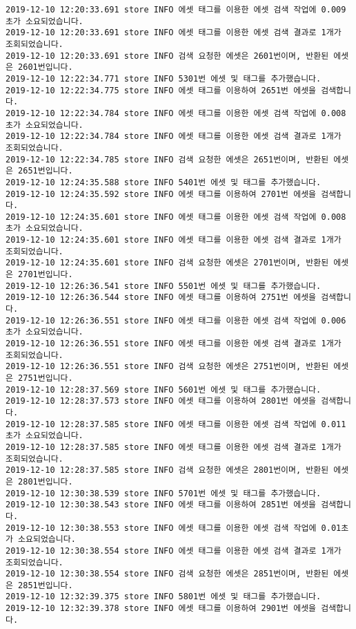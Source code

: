 \begin{Verbatim}[fontsize=\tiny, breaklines=true, breakanywhere=true]
2019-12-10 12:20:33.691 store INFO 에셋 태그를 이용한 에셋 검색 작업에 0.009초가 소요되었습니다.
2019-12-10 12:20:33.691 store INFO 에셋 태그를 이용한 에셋 검색 결과로 1개가 조회되었습니다.
2019-12-10 12:20:33.691 store INFO 검색 요청한 에셋은 2601번이며, 반환된 에셋은 2601번입니다.
2019-12-10 12:22:34.771 store INFO 5301번 에셋 및 태그를 추가했습니다.
2019-12-10 12:22:34.775 store INFO 에셋 태그를 이용하여 2651번 에셋을 검색합니다.
2019-12-10 12:22:34.784 store INFO 에셋 태그를 이용한 에셋 검색 작업에 0.008초가 소요되었습니다.
2019-12-10 12:22:34.784 store INFO 에셋 태그를 이용한 에셋 검색 결과로 1개가 조회되었습니다.
2019-12-10 12:22:34.785 store INFO 검색 요청한 에셋은 2651번이며, 반환된 에셋은 2651번입니다.
2019-12-10 12:24:35.588 store INFO 5401번 에셋 및 태그를 추가했습니다.
2019-12-10 12:24:35.592 store INFO 에셋 태그를 이용하여 2701번 에셋을 검색합니다.
2019-12-10 12:24:35.601 store INFO 에셋 태그를 이용한 에셋 검색 작업에 0.008초가 소요되었습니다.
2019-12-10 12:24:35.601 store INFO 에셋 태그를 이용한 에셋 검색 결과로 1개가 조회되었습니다.
2019-12-10 12:24:35.601 store INFO 검색 요청한 에셋은 2701번이며, 반환된 에셋은 2701번입니다.
2019-12-10 12:26:36.541 store INFO 5501번 에셋 및 태그를 추가했습니다.
2019-12-10 12:26:36.544 store INFO 에셋 태그를 이용하여 2751번 에셋을 검색합니다.
2019-12-10 12:26:36.551 store INFO 에셋 태그를 이용한 에셋 검색 작업에 0.006초가 소요되었습니다.
2019-12-10 12:26:36.551 store INFO 에셋 태그를 이용한 에셋 검색 결과로 1개가 조회되었습니다.
2019-12-10 12:26:36.551 store INFO 검색 요청한 에셋은 2751번이며, 반환된 에셋은 2751번입니다.
2019-12-10 12:28:37.569 store INFO 5601번 에셋 및 태그를 추가했습니다.
2019-12-10 12:28:37.573 store INFO 에셋 태그를 이용하여 2801번 에셋을 검색합니다.
2019-12-10 12:28:37.585 store INFO 에셋 태그를 이용한 에셋 검색 작업에 0.011초가 소요되었습니다.
2019-12-10 12:28:37.585 store INFO 에셋 태그를 이용한 에셋 검색 결과로 1개가 조회되었습니다.
2019-12-10 12:28:37.585 store INFO 검색 요청한 에셋은 2801번이며, 반환된 에셋은 2801번입니다.
2019-12-10 12:30:38.539 store INFO 5701번 에셋 및 태그를 추가했습니다.
2019-12-10 12:30:38.543 store INFO 에셋 태그를 이용하여 2851번 에셋을 검색합니다.
2019-12-10 12:30:38.553 store INFO 에셋 태그를 이용한 에셋 검색 작업에 0.01초가 소요되었습니다.
2019-12-10 12:30:38.554 store INFO 에셋 태그를 이용한 에셋 검색 결과로 1개가 조회되었습니다.
2019-12-10 12:30:38.554 store INFO 검색 요청한 에셋은 2851번이며, 반환된 에셋은 2851번입니다.
2019-12-10 12:32:39.375 store INFO 5801번 에셋 및 태그를 추가했습니다.
2019-12-10 12:32:39.378 store INFO 에셋 태그를 이용하여 2901번 에셋을 검색합니다.

\end{Verbatim}
